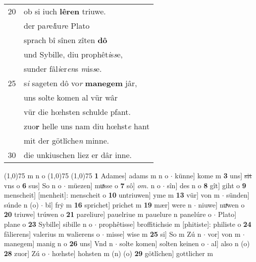 \documentclass[8pt,a4paper,notitlepage]{article}
\begin{document}
\begin{table}[ht]
\begin{minipage}[t]{0.5\linewidth}
\begin{tabular}{rl}
20 & ob si iuch \textbf{lêren} triuwe.\\ 
 & der pa\textit{r}e\textit{l}iu\textit{r}e Plato\\ 
 & sprach bî sînen zîten \textbf{dô}\\ 
 & und Sybille, diu prophêt\textit{i}s\textit{s}e,\\ 
 & sunder fâl\textit{i}er\textit{en}s \textit{m}is\textit{s}e.\\ 
25 & s\textit{i} sageten dô vo\textit{r} \textbf{manegem} jâr,\\ 
 & uns solte komen al vür wâr\\ 
 & vür die hœhsten schulde pfant.\\ 
 & zuo\textbf{r} helle uns nam diu hœhst\textit{e} hant\\ 
 & mit der götlîche\textit{n} minne.\\ 
30 & die unkiuschen liez er dâr inne.\\ 
\end{tabular}
\scriptsize
\line(1,0){75} \newline
m n o \newline
\line(1,0){75} \newline
\newline
\line(1,0){75} \newline
\textbf{1} Adames] adams m n o  $\cdot$ künne] kome m \textbf{3} uns] \sout{sit} vns o \textbf{6} sus] So n o  $\cdot$ müezen] muͯsse o \textbf{7} sô] \textit{om.} n o  $\cdot$ sîn] des n o \textbf{8} gît] giht o \textbf{9} menscheit] [menheit]: menscheit o \textbf{10} untriuwen] yme m \textbf{13} vür] von m  $\cdot$ sünden] súnde n (o)  $\cdot$ bî] frẏ m \textbf{16} sprichet] prichet m \textbf{19} mær] were n  $\cdot$ niuwe] nuͯwen o \textbf{20} triuwe] trúwen o \textbf{21} pareliure] pauelriue m pauelure n panelúre o  $\cdot$ Plato] plane o \textbf{23} Sybille] sibille n o  $\cdot$ prophêtisse] broffitichsie m [phitiste]: philiste o \textbf{24} fâlierens] valerius m walierens o  $\cdot$ misse] wise m \textbf{25} si] So m Zú n  $\cdot$ vor] von m  $\cdot$ manegem] manig n o \textbf{26} uns] Vnd n  $\cdot$ solte komen] solten keinen o  $\cdot$ al] also n (o) \textbf{28} zuor] Zú o  $\cdot$ hœhste] hohsten m (n) (o) \textbf{29} götlîchen] gottlicher m \newline
\end{minipage}
\end{table}
\newpage
\end{document}
